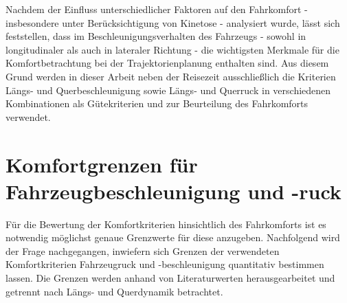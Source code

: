 Nachdem der Einfluss unterschiedlicher Faktoren auf den Fahrkomfort - insbesondere unter Berücksichtigung von Kinetose - analysiert wurde, lässt sich feststellen, dass im Beschleunigungsverhalten des Fahrzeugs - sowohl in longitudinaler als auch in lateraler Richtung - die wichtigsten Merkmale für die Komfortbetrachtung bei der Trajektorienplanung enthalten sind. Aus diesem Grund werden in dieser Arbeit neben der Reisezeit ausschließlich die Kriterien Längs- und Querbeschleunigung sowie Längs- und Querruck in verschiedenen Kombinationen als Gütekriterien und zur Beurteilung des Fahrkomforts verwendet. 

\section{Komfortgrenzen für Fahrzeugbeschleunigung und -ruck}
Für die Bewertung der Komfortkriterien hinsichtlich des Fahrkomforts ist es notwendig möglichst genaue Grenzwerte für diese anzugeben. Nachfolgend wird der Frage nachgegangen, inwiefern sich Grenzen der verwendeten Komfortkriterien Fahrzeugruck und -beschleunigung quantitativ bestimmen lassen. Die Grenzen werden anhand von Literaturwerten herausgearbeitet und getrennt nach Längs- und Querdynamik betrachtet.

